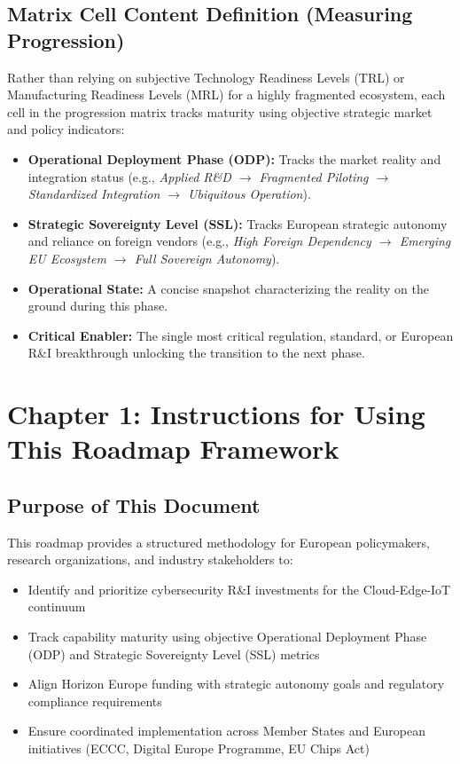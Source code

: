 \documentclass[12pt,a4paper]{article}
\begin{document}
\subsection*{Matrix Cell Content Definition (Measuring Progression)}
Rather than relying on subjective Technology Readiness Levels (TRL) or Manufacturing Readiness Levels (MRL) for a highly fragmented ecosystem, each cell in the progression matrix tracks maturity using objective strategic market and policy indicators:

\begin{itemize}
    \item \textbf{Operational Deployment Phase (ODP):} Tracks the market reality and integration status (e.g., \textit{Applied R\&D $\rightarrow$ Fragmented Piloting $\rightarrow$ Standardized Integration $\rightarrow$ Ubiquitous Operation}).
    \item \textbf{Strategic Sovereignty Level (SSL):} Tracks European strategic autonomy and reliance on foreign vendors (e.g., \textit{High Foreign Dependency $\rightarrow$ Emerging EU Ecosystem $\rightarrow$ Full Sovereign Autonomy}).
    \item \textbf{Operational State:} A concise snapshot characterizing the reality on the ground during this phase.
    \item \textbf{Critical Enabler:} The single most critical regulation, standard, or European R\&I breakthrough unlocking the transition to the next phase.
\end{itemize}

\newpage
\section{Chapter 1: Instructions for Using This Roadmap Framework}

\subsection*{Purpose of This Document}
This roadmap provides a structured methodology for European policymakers, research organizations, and industry stakeholders to:
\begin{itemize}
    \item Identify and prioritize cybersecurity R\&I investments for the Cloud-Edge-IoT continuum
    \item Track capability maturity using objective Operational Deployment Phase (ODP) and Strategic Sovereignty Level (SSL) metrics
    \item Align Horizon Europe funding with strategic autonomy goals and regulatory compliance requirements
    \item Ensure coordinated implementation across Member States and European initiatives (ECCC, Digital Europe Programme, EU Chips Act)
\end{itemize}
\end{document}
